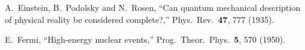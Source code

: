 \begin{thebibliography}{99}

  A.~Einstein, B.~Podolsky and N.~Rosen,
  ``Can quantum mechanical description of physical reality be considered
  complete?,''
  Phys.\ Rev.\  {\bf 47}, 777 (1935).

  E.~Fermi,
  ``High-energy nuclear events,''
  Prog.\ Theor.\ Phys.\  {\bf 5}, 570 (1950).

\end{thebibliography}
